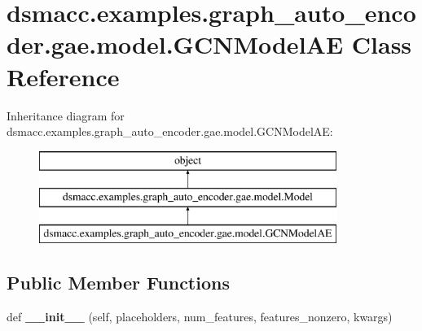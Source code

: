 \hypertarget{classdsmacc_1_1examples_1_1graph__auto__encoder_1_1gae_1_1model_1_1GCNModelAE}{}\section{dsmacc.\+examples.\+graph\+\_\+auto\+\_\+encoder.\+gae.\+model.\+G\+C\+N\+Model\+AE Class Reference}
\label{classdsmacc_1_1examples_1_1graph__auto__encoder_1_1gae_1_1model_1_1GCNModelAE}
Inheritance diagram for dsmacc.\+examples.\+graph\+\_\+auto\+\_\+encoder.\+gae.\+model.\+G\+C\+N\+Model\+AE\+:\begin{figure}[H]
\begin{center}
\leavevmode
\includegraphics[height=3.000000cm]{classdsmacc_1_1examples_1_1graph__auto__encoder_1_1gae_1_1model_1_1GCNModelAE}
\end{center}
\end{figure}
\subsection*{Public Member Functions}
\begin{DoxyCompactItemize}
\item 
\mbox{\label{classdsmacc_1_1examples_1_1graph__auto__encoder_1_1gae_1_1model_1_1GCNModelAE_ab9281e300eb458d7bb5dffde5ad60305}} 
def {\bfseries \+\_\+\+\_\+init\+\_\+\+\_\+} (self, placeholders, num\+\_\+features, features\+\_\+nonzero, kwargs)
\end{DoxyCompactItemize}

